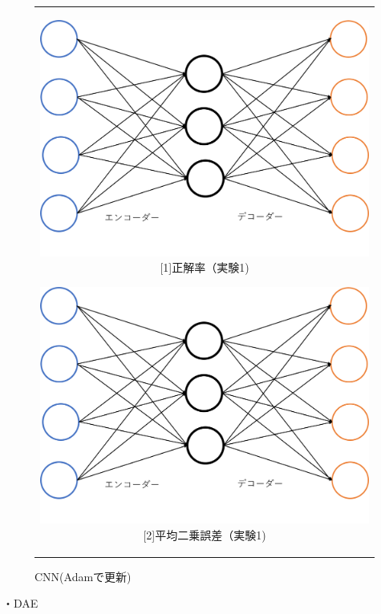 \documentclass[12pt]{jsarticle}
\begin{document}
\begin{figure}[h]
  \begin{center}
    \begin{tabular}{c}

      \begin{minipage}{0.43\hsize}
        \begin{center}
          \includegraphics[clip, width=\linewidth]{AE_image.png}
          \hspace{0.2cm} [1]正解率（実験1)
        \end{center}
      \end{minipage}

      \begin{minipage}{0.43\hsize}
        \begin{center}
          \includegraphics[clip, width=\linewidth]{AE_image.png}
          \hspace{0.2cm} [2]平均二乗誤差（実験1)
        \end{center}
      \end{minipage}


    \end{tabular}
    \caption{CNN(Adamで更新)}
     \label{fig:accuracy}
  \end{center}
\end{figure}
・DAE
\end{document}
